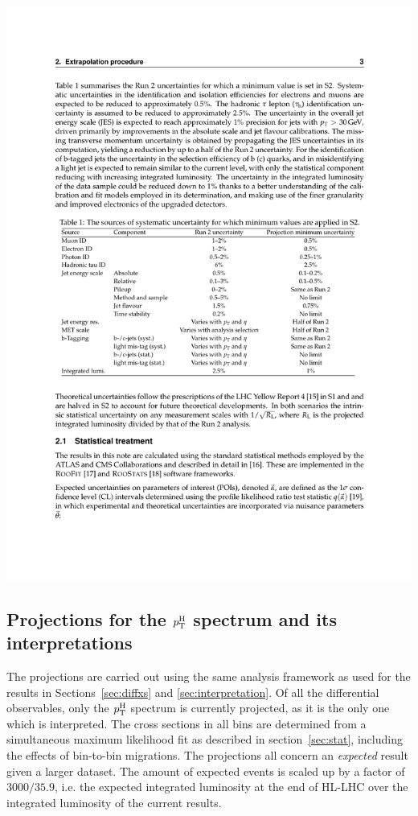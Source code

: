 \begin{table}[hbtp]
\centering
{}
\label{tab:s2unc}
\includegraphics[width=0.99\linewidth]{img/projections/hllhc-unc-s2.pdf}
\end{table}



\subsection{Projections for the  \texorpdfstring{$p_\mathrm{T}^\mathrm{H}$}{pT(H)} spectrum and its interpretations}
\label{sec:projection-results}

The projections are carried out using the same analysis framework as used for the results in Sections~\ref{sec:diffxs} and \ref{sec:interpretation}.
% 
Of all the differential observables, only the $p_\mathrm{T}^\mathrm{H}$ spectrum is currently projected, as it is the only one which is interpreted.
% 
The cross sections in all bins are determined from a simultaneous maximum likelihood fit as described in section~\ref{sec:stat}, including the effects of bin-to-bin migrations.
% 
The projections all concern an \emph{expected} result given a larger dataset.
% 
The amount of expected events is scaled up by a factor of $3000 / 35.9$, i.e. the expected integrated luminosity at the end of HL-LHC over the integrated luminosity of the current results.


